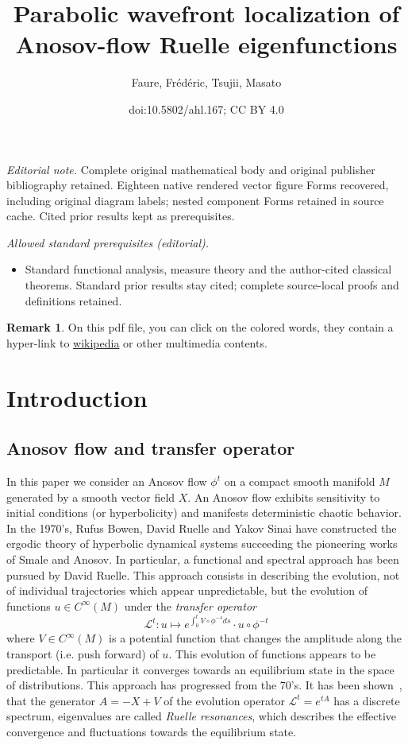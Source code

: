 \documentclass[10pt]{amsart}
\title{Parabolic wavefront localization of Anosov-flow Ruelle eigenfunctions}
\author{Faure, Frédéric, Tsujii, Masato}
\date{doi:10.5802/ahl.167; CC BY 4.0}
\theoremstyle{definition}\newtheorem{defi}[theo]{Definition}\newtheorem{rema}[theo]{Remark}\newtheorem{exam}[theo]{Example}\newtheorem{exem}[theo]{Example}\newtheorem{nota}[theo]{Notation}
\newcommand{\clL}{\mathcal{L}}
\begin{document}
\maketitle
\noindent\textit{Editorial note.} Complete original mathematical body and original publisher bibliography retained. Eighteen native rendered vector figure Forms recovered, including original diagram labels; nested component Forms retained in source cache. Cited prior results kept as prerequisites.\par\medskip
\noindent\textit{Allowed standard prerequisites (editorial).}\begin{itemize}
\item Standard functional analysis, measure theory and the author-cited classical theorems. Standard prior results stay cited; complete source-local proofs and definitions retained.
\end{itemize}\medskip
\setcounter{tocdepth}{2}
\tableofcontents{}

\begin{rema}
On this pdf file, you can click on the colored words, they contain a hyper-link to \href{https://en.wikipedia.org/wiki/Main_Page}{wikipedia} or other multimedia contents.
\end{rema}



\section{Introduction}

\subsection*{Anosov flow and transfer operator}

In this paper we consider an Anosov flow $\phi^{t}$ on a compact smooth manifold $M$ generated by a smooth vector field $X$. An Anosov flow exhibits sensitivity to initial conditions (or hyperbolicity) and manifests deterministic chaotic behavior. In the 1970's, Rufus Bowen, David Ruelle and Yakov Sinai have constructed the ergodic theory of hyperbolic dynamical systems succeeding the pioneering works of Smale and Anosov. In particular, a functional and spectral approach has been pursued by David Ruelle. This approach consists in describing the evolution, not of individual trajectories which appear unpredictable, but the evolution of functions $u\in C^{\infty}(M)$ under the \emph{transfer operator}
\[
\clL^{t}:u\mapsto e^{\int_{0}^{t}V\circ\phi^{-s}ds}\cdot u\circ\phi^{-t}
\]
where $V\in C^{\infty}(M)$ is a potential function that changes the amplitude along the transport (i.e. push forward) of $u$. This evolution of functions appears to be predictable. In particular it converges towards an equilibrium state in the space of distributions. This approach has progressed from the 70's. It has been shown~\cite{Baladi05,liverani_02,liverani_butterley_07,baladi_05,dyatlov_guillarmou_2014,fred-RP-06,fred-roy-sjostrand-07,fred_flow_09,liverani_04}, that the generator $A=-X+V$ of the evolution operator $\clL^{t}=e^{tA}$ has a discrete spectrum, eigenvalues are called\emph{ Ruelle resonances}, which describes the effective convergence and fluctuations towards the equilibrium state.
\end{document}
